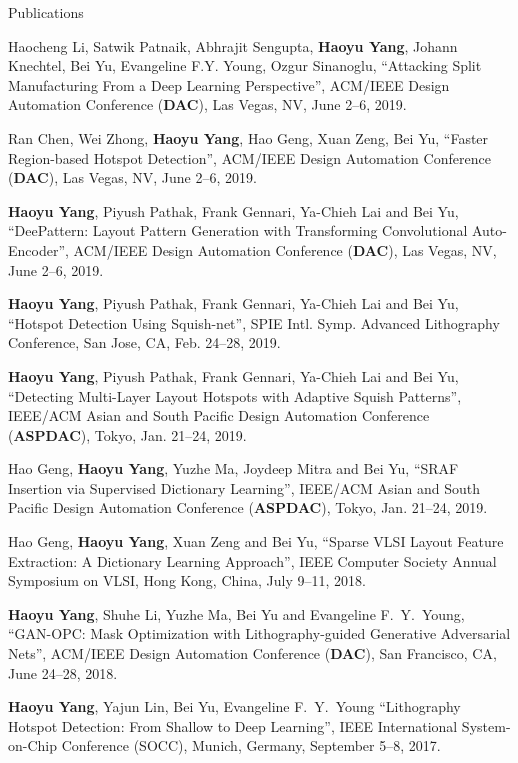 \begin{rSection}{Publications}
\begin{description}[font=\normalfont]
	\item[{[C12]}]{
	Haocheng Li, Satwik Patnaik, Abhrajit Sengupta, \textbf{Haoyu Yang}, Johann Knechtel, Bei Yu, Evangeline F.Y. Young, Ozgur Sinanoglu, 
	``Attacking Split Manufacturing From a Deep Learning Perspective'',  
	ACM/IEEE Design Automation Conference (\textbf{DAC}), Las Vegas, NV, June 2--6, 2019.
	}
	\item[{[C11]}]{
	Ran Chen, Wei Zhong, \textbf{Haoyu Yang}, Hao Geng, Xuan Zeng, Bei Yu, ``Faster Region-based Hotspot Detection'',  
	ACM/IEEE Design Automation Conference (\textbf{DAC}), Las Vegas, NV, June 2--6, 2019.
	}
	\item[{[C10]}]{
	\textbf{Haoyu Yang}, Piyush Pathak, Frank Gennari, Ya-Chieh Lai and Bei Yu, ``DeePattern: Layout Pattern Generation with Transforming Convolutional Auto-Encoder'',  
	ACM/IEEE Design Automation Conference (\textbf{DAC}), Las Vegas, NV, June 2--6, 2019.
	}
	\item[{[C9]}]{
	\textbf{Haoyu Yang}, Piyush Pathak, Frank Gennari, Ya-Chieh Lai and Bei Yu, ``Hotspot Detection Using Squish-net'',  
	SPIE Intl. Symp. Advanced Lithography Conference, San Jose, CA, Feb. 24--28, 2019.
	}
	\item[{[C8]}]{
	\textbf{Haoyu Yang}, Piyush Pathak, Frank Gennari, Ya-Chieh Lai and Bei Yu, ``Detecting Multi-Layer Layout Hotspots with Adaptive Squish Patterns'',  
	IEEE/ACM Asian and South Pacific Design Automation Conference (\textbf{ASPDAC}), Tokyo, Jan. 21--24, 2019.
	}
	\item[{[C7]}]{
	Hao Geng, \textbf{Haoyu Yang}, Yuzhe Ma, Joydeep Mitra and Bei Yu, ``SRAF Insertion via Supervised Dictionary Learning'',  
	IEEE/ACM Asian and South Pacific Design Automation Conference (\textbf{ASPDAC}), Tokyo, Jan. 21--24, 2019.
	}
	\item[{[C6]}]{
		Hao Geng, \textbf{Haoyu Yang}, Xuan Zeng and Bei Yu, ``Sparse VLSI Layout Feature Extraction: A Dictionary Learning Approach'',  
		IEEE Computer Society Annual Symposium on VLSI, Hong Kong, China, July 9--11, 2018.
	}
	\item[{[C5]}]{
		\textbf{Haoyu Yang}, Shuhe Li, Yuzhe Ma, Bei Yu and Evangeline F.~Y.~Young, ``GAN-OPC: Mask Optimization with Lithography-guided Generative Adversarial Nets'', ACM/IEEE Design Automation Conference (\textbf{DAC}), San Francisco, CA, June 24--28, 2018. 
	}	
	\item[{[C4]}]{
		\textbf{Haoyu Yang}, Yajun Lin, Bei Yu, Evangeline F.~Y.~Young
		``Lithography Hotspot Detection: From Shallow to Deep Learning'',
		IEEE International System-on-Chip Conference (SOCC), Munich, Germany, September 5--8, 2017. 
}
\end{description}
\end{rSection}
